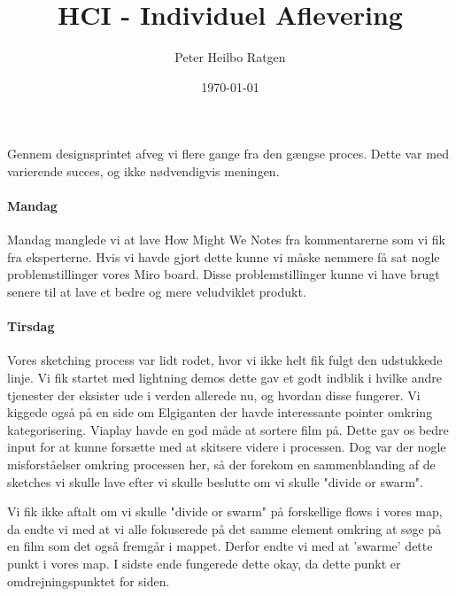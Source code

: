 \documentclass{article}
\title{HCI - Individuel Aflevering}
\author{Peter Heilbo Ratgen}
\date{\today}
\begin{document}
\maketitle
Gennem designsprintet afveg vi flere gange fra den gængse proces. Dette var med
varierende succes, og ikke nødvendigvis meningen.


\paragraph{Mandag}

Mandag manglede vi at lave How Might We Notes fra kommentarerne som vi fik fra
eksperterne. Hvis vi havde gjort dette kunne vi måske nemmere få sat nogle
problemstillinger vores Miro board. Disse problemstillinger kunne vi have brugt
senere til at lave et bedre og mere veludviklet produkt.

\paragraph{Tirsdag}


Vores sketching process var lidt rodet, hvor vi ikke helt fik fulgt den
udstukkede linje. Vi fik startet med lightning demos dette gav et godt indblik i
hvilke andre tjenester der eksister ude i verden allerede nu, og hvordan disse
fungerer. Vi kiggede også på en side om Elgiganten der havde interessante
pointer omkring kategorisering.  Viaplay havde en god måde at sortere film på.
Dette gav os bedre input for at kunne forsætte med at skitsere videre i
processen. Dog var der nogle misforståelser omkring processen her, så der
forekom en sammenblanding af de sketches vi skulle lave efter vi skulle beslutte
om vi skulle "divide or swarm". 

Vi fik ikke aftalt om vi skulle "divide or swarm" på forskellige flows i vores
map, da endte vi med at vi alle fokuserede på det samme element omkring at søge
på en film som det også fremgår i mappet. Derfor endte vi med at 'swarme' dette
punkt i vores map. I sidste ende fungerede dette okay, da dette punkt er
omdrejningspunktet for siden.
\end{document}
